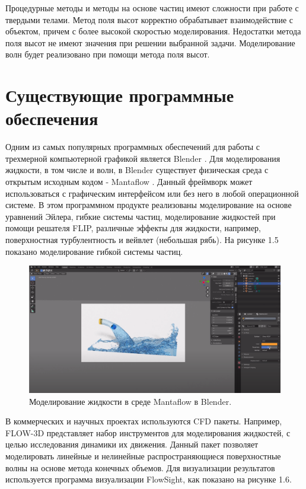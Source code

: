 Процедурные методы и методы на основе частиц имеют сложности при работе с твердыми телами. Метод поля высот корректно обрабатывает взаимодействие с объектом, причем с более высокой скоростью моделирования. Недостатки метода поля высот не имеют значения при решении выбранной задачи. Моделирование волн будет реализовано при помощи метода поля высот.

\section{Существующие программные обеспечения}

Одним из самых популярных программных обеспечений для работы с трехмерной компьютерной графикой является Blender \cite{blender}. Для моделирования жидкости, в том числе и волн, в Blender существует физическая среда с открытым исходным кодом - Mantaflow \cite{mantaflow}. Данный фреймворк может использоваться с графическим интерфейсом или без него в любой операционной системе. В этом программном продукте реализованы моделирование на основе уравнений Эйлера, гибкие системы частиц, моделирование жидкостей при помощи решателя FLIP, различные эффекты для жидкости, например, поверхностная турбулентность и вейвлет (небольшая рябь). На рисунке 1.5 показано моделирование гибкой системы частиц. 

\begin{figure}[H]
	\begin{center}
		\includegraphics[scale=0.2]{img/mantaflow.png}
	\end{center}
	\captionsetup{justification=centering}
	\caption{Моделирование жидкости в среде Mantaflow в Blender.}
	\label{img:mantaflow}
\end{figure}

В коммерческих и научных проектах используются CFD пакеты. Например, FLOW-3D \cite{flow-3d} представляет набор инструментов для моделирования жидкостей, с целью исследования динамики их движения. Данный пакет позволяет моделировать линейные и нелинейные распространяющиеся поверхностные волны на основе метода конечных объемов. Для визуализации результатов используется программа визуализации FlowSight, как показано на рисунке 1.6.

